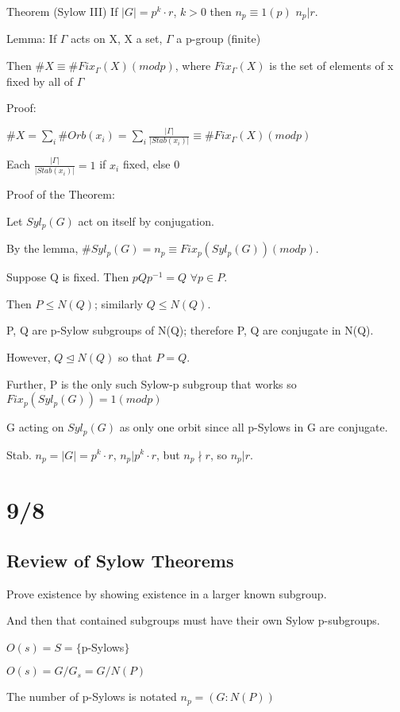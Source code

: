\documentclass[12pt]{article}
\newcommand{\inv}{^{-1}}
\begin{document}
\noindent
Theorem (Sylow III) If $|G|= p^k \cdot r$, $k > 0$ then $n_p \equiv 1 (p)$ $n_p | r$.

\noindent
Lemma: If $\Gamma$ acts on X, X a set, $\Gamma$ a p-group (finite)

Then $\#X \equiv \#Fix_\Gamma(X) (mod p)$, where $Fix_\Gamma(X)$ is the set of elements of x fixed by all of $\Gamma$

\noindent
Proof:

$\#X = \sum_i \#Orb(x_i) = \sum_i \frac{|\Gamma|}{|Stab(x_i)|} \equiv \#Fix_\Gamma(X) (mod p)$

Each $\frac{|\Gamma|}{|Stab(x_i)|} = 1$ if $x_i$ fixed, else 0

\noindent
Proof of the Theorem:

Let $Syl_p(G)$ act on itself by conjugation.

By the lemma, $\#Syl_p(G) = n_p \equiv Fix_p(Syl_p(G)) (mod p)$.

Suppose Q is fixed.  Then $pQp\inv = Q$ $\forall p \in P$.

Then $P \leq N(Q)$; similarly $Q \leq N(Q)$.

P, Q are p-Sylow subgroups of N(Q); therefore P, Q are conjugate in N(Q).

However, $Q \trianglelefteq N(Q)$ so that $P = Q$.

Further, P is the only such Sylow-p subgroup that works so $Fix_p(Syl_p(G)) = 1 (mod p)$

G acting on $Syl_p(G)$ as only one orbit since all p-Sylows in G are conjugate.

Stab. $n_p = |G| = p^k \cdot r$, $n_p | p^k \cdot r$, but $n_p \nmid r$, so $n_p | r$.

\section{9/8}

\subsection{Review of Sylow Theorems}

Prove existence by showing existence in a larger known subgroup.

And then that contained subgroups must have their own Sylow p-subgroups.

$O(s) = S = \{$p-Sylows$\}$

$O(s) = G\slash G_s = G \slash N(P)$

The number of p-Sylows is notated $n_p = (G : N(P))$
\end{document}
